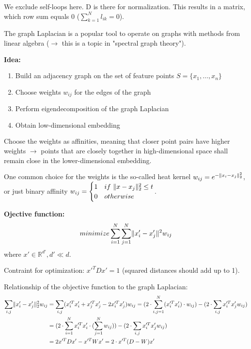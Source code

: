 \documentclass{scrartcl}
\DeclarePairedDelimiter\norm{\lVert}{\rVert}%
\begin{document}
We exclude self-loops here. D is there for normalization. This results in a matrix, which row sum equals \(0\) (\(\sum_{k=1}^N l_{ik} = 0\)).

The graph Laplacian is a popular tool to operate on graphs with methods from linear algebra (\(\rightarrow\) this is a topic in "spectral graph theory").

\bigbreak

\textbf{Idea:}
\begin{enumerate}
    \item
        Build an adjacency graph on the set of feature points \(S=\{x_1, \dots, x_n\}\) 
    \item
        Choose weights \(w_{ij}\) for the edges of the graph
    \item
        Perform eigendecomposition of the graph Laplacian
    \item
        Obtain low-dimensional embedding
\end{enumerate}
Choose the weights as affinities, meaning that closer point pairs have higher weights \(\rightarrow\) points that are closely together in high-dimensional space shall remain close in the lower-dimensional embedding.

One common choice for the weights is the so-called heat kernel \(w_{ij} = e^{-\norm{x_i - x_j}_2^2}\), or just binary affinity 
\(w_{ij} = \begin{cases} 1 & if \ \norm{x-x_j}_2^2 \leq t \\0 & otherwise \end{cases}\).

\bigbreak

\textbf{Ojective function:}
\[minimize \sum_{i=1}^{N}\sum_{j=1}^{N}\norm{x_i'- x_j'}^2 w_{ij}\]
where \(x'\in \mathbb{R}^{d'}, d' \ll d\).

Contraint for optimization: \(x'^T D x' = 1\) (squared distances should add up to 1).

Relationship of the objective function to the graph Laplacian:
\begin{align*}
    \sum_{i,j} \norm{x_i' - x_j'}_2^2 w_{ij} &= \sum_{i,j} (x_i'^T x_i' + x_j'^T x_j' - 2 x_i'^T x_j') w_{ij} = (2\cdot \sum_{i,j=1}^N(x_i'^T x_i') \cdot w_{ij}) - (2 \cdot \sum_{i,j} x_i'^T x_j' w_{ij})\\
    &= (2 \cdot \sum_{i=1}^N x_i'^T x_i' \cdot (\sum_{j=1}^N w_{ij}))- (2 \cdot \sum_{i,j} x_i'^T x_j' w_{ij})\\
    &= 2 x'^T D x' - x'^TWx' = 2 \cdot x'^T (D-W) x'
\end{align*}
\end{document}
